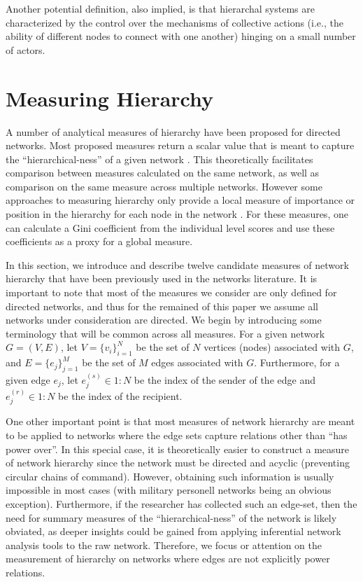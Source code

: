 \documentclass[3p,times]{elsarticle}
\begin{document}
Another potential definition, also implied, is that hierarchal systems are characterized by the control over the mechanisms of collective actions (i.e., the ability of different nodes to connect with one another) hinging on a small number of actors. %

\section{Measuring Hierarchy}
A number of analytical measures of hierarchy have been proposed for directed networks. Most proposed measures return a scalar value that is meant to capture the ``hierarchical-ness'' of a given network \cite{Mones2012, Shizuka2012, bonacich1972factoring, freeman1977set, Kendall1940, landau1951dominance, Suchecki2013a}. This theoretically facilitates comparison between measures calculated on the same network, as well as comparison on the same measure across multiple networks. However some approaches to measuring hierarchy only provide a local measure of importance or position in the hierarchy for each node in the network \cite{an2015multilevel}. For these measures, one can calculate a Gini coefficient \cite{yitzhaki1979relative} from the individual level scores and use these coefficients as a proxy for a global measure. 

In this section, we introduce and describe twelve candidate measures of network hierarchy that have been previously used in the networks literature. It is important to note that most of the measures we consider are only defined for directed networks, and thus for the remained of this paper we assume all networks under consideration are directed. We begin by introducing some terminology that will be common across all measures. For a given network $G=(V,E)$, let $V=\{v_i\}_{i=1}^N$ be the set of $N$ vertices (nodes) associated with $G$, and $E=\{e_j\}_{j=1}^M$ be the set of $M$ edges associated with $G$. Furthermore, for a given edge $e_j$, let $e_j^{(s)} \in 1:N$ be the index of the sender of the edge and $e_j^{(r)} \in 1:N$ be the index of the recipient. 

One other important point is that most measures of network hierarchy are meant to be applied to networks where the edge sets capture relations other than ``has power over''. In this special case, it is theoretically easier to construct a measure of network hierarchy since the network must be directed and acyclic (preventing circular chains of command). However, obtaining such information is usually impossible in most cases (with military personell networks being an obvious exception). Furthermore, if the researcher has collected such an edge-set, then the need for summary measures of the ``hierarchical-ness'' of the network is likely obviated, as deeper insights could be gained from applying inferential network analysis tools to the raw network. Therefore, we focus or attention on the measurement of hierarchy on networks where edges are not explicitly power relations.
\end{document}
